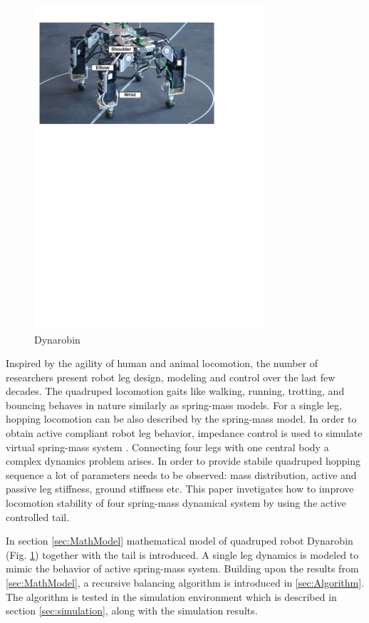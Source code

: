 \begin{figure}
	\centering
	\includegraphics[width=85mm]{./pictures/Dynarobin_introduction_image.pdf}
	\caption{Dynarobin}
	\label{fig:Dynarobin}
\end{figure}

Inspired by the agility of human and animal locomotion, the number of researchers present robot leg design, modeling and control over the last few decades\cite{CambridgeJournals:1345088}. The quadruped locomotion gaits like walking, running, trotting, and bouncing behaves in nature similarly as spring-mass models\cite{Blickhan01}. For a single leg, hopping locomotion can be also described by the spring-mass model. In order to obtain active compliant robot leg behavior, impedance control is used to simulate virtual spring-mass system \cite{Havoutis01}. Connecting four legs with one central body a complex dynamics problem arises. In order to provide stabile quadruped hopping sequence a lot of parameters needs to be observed: mass distribution, active and passive leg stiffness, ground stiffness etc. This paper invetigates how to improve locomotion stability of four spring-mass dynamical system by using the active controlled tail.

In section \ref{sec:MathModel} mathematical model of quadruped robot Dynarobin (Fig. \ref{fig:Dynarobin}) together with the tail is introduced. A single leg dynamics is modeled to mimic the behavior of active spring-mass system. Building upon the results from \ref{sec:MathModel}, a recursive balancing algorithm is introduced in \ref{sec:Algorithm}. The algorithm is tested in the simulation environment which is described in section \ref{sec:simulation}, along with the simulation results. 







